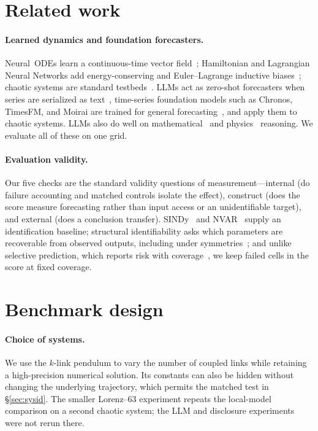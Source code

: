 \documentclass{article}
\begin{document}
\section{Related work}
\paragraph{Learned dynamics and foundation forecasters.} Neural~ODEs learn a continuous-time
vector field~\citep{chen2018node}; Hamiltonian and Lagrangian Neural Networks add
energy-conserving and Euler--Lagrange inductive biases~\citep{greydanus2019hnn,cranmer2020lnn};
chaotic systems are standard testbeds~\citep{gilpin2021chaos}. LLMs act as zero-shot forecasters
when series are serialized as text~\citep{gruver2023llmtime}, time-series foundation models such
as Chronos, TimesFM, and Moirai are trained for general forecasting~\citep{ansari2024chronos,das2024timesfm,woo2024moirai},
and \citet{zhang2025zeroshotchaos} apply them to chaotic systems. LLMs also do well on
mathematical~\citep{lewkowycz2022minerva,wei2022cot} and physics~\citep{xu2025ugphysics}
reasoning. We evaluate all of these on one grid.

\paragraph{Evaluation validity.} Our five checks are the standard validity questions of
measurement---internal (do failure accounting and matched controls isolate the effect), construct
(does the score measure forecasting rather than input access or an unidentifiable target), and
external (does a conclusion transfer). SINDy~\citep{brunton2016sindy} and
NVAR~\citep{gauthier2021nvar} supply an identification baseline; structural identifiability asks
which parameters are recoverable from observed outputs, including under
symmetries~\citep{borgqvist2024symmetries}; and unlike selective prediction, which reports risk
with coverage~\citep{geifman2017selective}, we keep failed cells in the score at fixed coverage.

\section{Benchmark design}
\paragraph{Choice of systems.} We use the $k$-link pendulum to vary the number of coupled links
while retaining a high-precision numerical solution. Its constants can also be hidden without
changing the underlying trajectory, which permits the matched test in \S\ref{sec:sysid}.
The smaller Lorenz--63 experiment repeats the local-model comparison on a second
chaotic system; the LLM and disclosure experiments were not rerun there.
\end{document}
